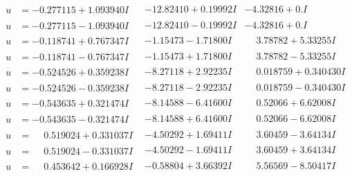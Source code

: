 \documentclass[1p]{elsarticle_modified}
\theoremstyle{definition}
\begin{document}
$$\begin{array}{c|c|c}
\begin{aligned}
u &= -0.277115 + 1.093940 I\end{aligned}
 & -12.82410 + 0.19992 I & -4.32816 + 0. I\phantom{ +0.000000I} \\ \hline\begin{aligned}
u &= -0.277115 - 1.093940 I\end{aligned}
 & -12.82410 - 0.19992 I & -4.32816 + 0. I\phantom{ +0.000000I} \\ \hline\begin{aligned}
u &= -0.118741 + 0.767347 I\end{aligned}
 & -1.15473 - 1.71800 I & \phantom{-}3.78782 + 5.33255 I \\ \hline\begin{aligned}
u &= -0.118741 - 0.767347 I\end{aligned}
 & -1.15473 + 1.71800 I & \phantom{-}3.78782 - 5.33255 I \\ \hline\begin{aligned}
u &= -0.524526 + 0.359238 I\end{aligned}
 & -8.27118 + 2.92235 I & \phantom{-}0.018759 + 0.340430 I \\ \hline\begin{aligned}
u &= -0.524526 - 0.359238 I\end{aligned}
 & -8.27118 - 2.92235 I & \phantom{-}0.018759 - 0.340430 I \\ \hline\begin{aligned}
u &= -0.543635 + 0.321474 I\end{aligned}
 & -8.14588 - 6.41600 I & \phantom{-}0.52066 + 6.62008 I \\ \hline\begin{aligned}
u &= -0.543635 - 0.321474 I\end{aligned}
 & -8.14588 + 6.41600 I & \phantom{-}0.52066 - 6.62008 I \\ \hline\begin{aligned}
u &= \phantom{-}0.519024 + 0.331037 I\end{aligned}
 & -4.50292 + 1.69411 I & \phantom{-}3.60459 - 3.64134 I \\ \hline\begin{aligned}
u &= \phantom{-}0.519024 - 0.331037 I\end{aligned}
 & -4.50292 - 1.69411 I & \phantom{-}3.60459 + 3.64134 I \\ \hline\begin{aligned}
u &= \phantom{-}0.453642 + 0.166928 I\end{aligned}
 & -0.58804 + 3.66392 I & \phantom{-}5.56569 - 8.50417 I \\ \hline\begin{aligned}

\end{aligned}
\end{array}$$
\end{document}

